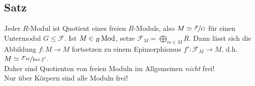 \subsection[Satz: Jeder $R$-Modul ist Quotient eines freien $R$-Moduls]{Satz} %
\label{sub:237}
Jeder $R$-Modul ist Quotient eines freien $R$-Moduls, also $M \simeq \nicefrac{\mathcal{F}}{G}$ für einen Untermodul $G \le \mathcal{F}$.
Ist $M \in {_R \operatorname{Mod}}$, setze $\mathcal{F}_M = \bigoplus_{m \in M} R$. Dann lässt sich die Abbildung
$f : M \to M$ fortsetzen zu einem Epimorphismus $f' : \mathcal{F}_M \to M$, d.h. $M \simeq \nicefrac{\mathcal{F}_M}{\ker f'}$. \bewende \smallskip \\
Daher sind Quotienten von freien Moduln im Allgemeinen \emph{nicht} frei! \\
Nur über Körpern sind alle Moduln frei!

